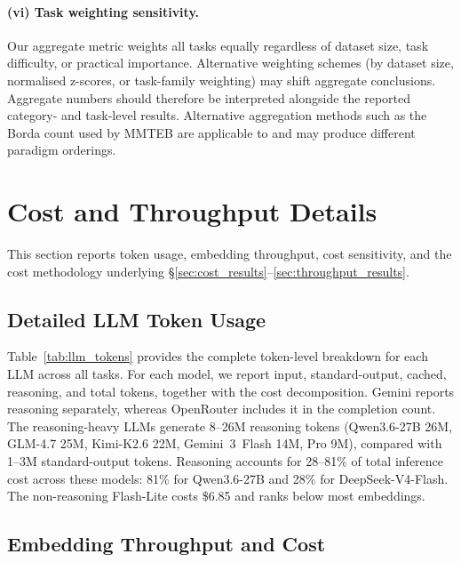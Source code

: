 \paragraph{(vi) Task weighting sensitivity.}
Our aggregate metric weights all \mteblm{} tasks equally regardless of dataset size, task difficulty, or practical importance.
Alternative weighting schemes (by dataset size, normalised z-scores, or task-family weighting) may shift aggregate conclusions.
Aggregate numbers should therefore be interpreted alongside the reported category- and task-level results.
Alternative aggregation methods such as the Borda count used by MMTEB \citep{enevoldsen2025mmtebmassivemultilingualtext} are applicable to \mteblm{} and may produce different paradigm orderings.


\section{Cost and Throughput Details}
\label{app:tokens}

This section reports token usage, embedding throughput, cost sensitivity, and the cost methodology underlying \S\ref{sec:cost_results}--\ref{sec:throughput_results}.

\subsection{Detailed LLM Token Usage}
\label{app:tokens_table}

Table~\ref{tab:llm_tokens} provides the complete token-level breakdown for each LLM across all \mteblm{} tasks.
For each model, we report input, standard-output, cached, reasoning, and total tokens, together with the cost decomposition. Gemini reports reasoning separately, whereas OpenRouter includes it in the completion count.
The reasoning-heavy LLMs generate 8--26M reasoning tokens (Qwen3.6-27B 26M, GLM-4.7 25M, Kimi-K2.6 22M, Gemini~3~Flash 14M, Pro 9M), compared with 1--3M standard-output tokens. Reasoning accounts for 28--81\% of total inference cost across these models: 81\% for Qwen3.6-27B and 28\% for DeepSeek-V4-Flash.
The non-reasoning Flash-Lite costs \$6.85 and ranks below most embeddings.



\subsection{Embedding Throughput and Cost}
\label{app:emb_throughput}

